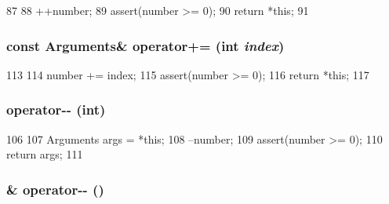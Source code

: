 \begin{DoxyCode}
87                             {
88         ++number;
89         assert(number >= 0);
90         return *this;
91     }
\end{DoxyCode}
\hypertarget{classArguments_af0541e490df70f1796521b3b8eaf28d3}{
\subsubsection[{operator+=}]{\setlength{\rightskip}{0pt plus 5cm}const {\bf Arguments}\& operator+= (int {\em index})}}
\label{classArguments_af0541e490df70f1796521b3b8eaf28d3}



\begin{DoxyCode}
113                                            {
114         number += index;
115         assert(number >= 0);
116         return *this;
117     }
\end{DoxyCode}
\hypertarget{classArguments_a48c3f69cad8d94dfd870884c988e1c38}{
\subsubsection[{operator-\/-\/}]{ operator-\/-\/ (int)}}
\label{classArguments_a48c3f69cad8d94dfd870884c988e1c38}



\begin{DoxyCode}
106                               {
107         Arguments args = *this;
108         --number;
109         assert(number >= 0);
110         return args;
111     }
\end{DoxyCode}
\hypertarget{classArguments_a13cd604ebb2ebefe1bb500cc9d88e5b8}{
\subsubsection[{operator-\/-\/}]{\& operator-\/-\/ ()}}
\label{classArguments_a13cd604ebb2ebefe1bb500cc9d88e5b8}



